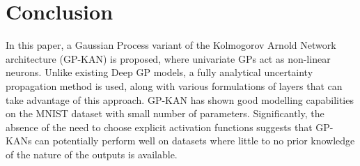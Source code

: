 \documentclass{article}
\begin{document}
\section{Conclusion}

In this paper, a Gaussian Process variant of the Kolmogorov Arnold Network architecture (GP-KAN) is proposed, where univariate GPs act as non-linear neurons. Unlike existing Deep GP models, a fully analytical uncertainty propagation method is used, along with various formulations of layers that can take advantage of this approach. GP-KAN has shown good modelling capabilities on the MNIST dataset with small number of parameters. Significantly, the absence of the need to choose explicit activation functions suggests that GP-KANs can potentially perform well on datasets where little to no prior knowledge of the nature of the outputs is available.



\end{document}
